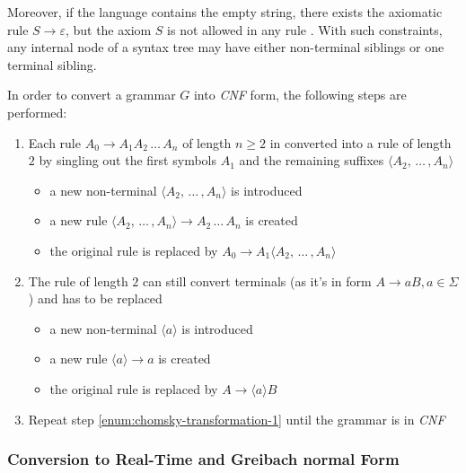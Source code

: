\documentclass[english]{article}
\begin{document}
Moreover, if the language contains the empty string, there exists the axiomatic rule \(S \rightarrow \varepsilon\), but the axiom \(S\) is not allowed in any rule \RP.
With such constraints, any internal node of a syntax tree may have either non-terminal siblings or one terminal sibling.

In order to convert a grammar \(G\) into \textit{CNF} form, the following steps are performed:

\begin{enumerate}[label=\arabic*., ref=(\arabic*)]
  \item\label{enum:chomsky-transformation-1} Each rule \(A_0 \rightarrow A_1 A_2 \,\ldots\, A_n\) of length \(n \geq 2\) in converted into a rule of length \(2\) by singling out the first symbols \(A_1\) and the remaining suffixes \(\langle A_2, \,\ldots\, , A_n \rangle\)
  \begin{itemize}
    \item a new non-terminal \(\langle A_2, \,\ldots\, , A_n \rangle\) is introduced
    \item a new rule \(\langle A_2, \,\ldots\, , A_n \rangle \rightarrow A_2 \,\ldots\, A_n\) is created
    \item the original rule is replaced by \(A_0 \rightarrow A_1 \langle A_2, \,\ldots\, , A_n \rangle\)
  \end{itemize}
  \item The rule of length \(2\) can still convert terminals (as it's in form \(A \rightarrow aB, a \in \Sigma\)) and has to be replaced
        \begin{itemize}
          \item a new non-terminal \(\langle a \rangle\) is introduced
          \item a new rule \(\langle a \rangle \rightarrow a\) is created
          \item the original rule is replaced by \(A \rightarrow \langle a \rangle B\)
        \end{itemize}
  \item Repeat step \ref{enum:chomsky-transformation-1} until the grammar is in \textit{CNF}
\end{enumerate}

\subsubsection{Conversion to Real-Time and Greibach normal Form}
\label{sec:conversion-to-greibach-and-real-time-normal-form}
\end{document}
